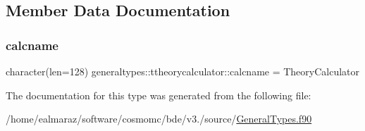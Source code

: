 \subsection{Member Data Documentation}
\mbox{\label{structgeneraltypes_1_1ttheorycalculator_a067210b836798b1f943cece4b98030ca}} 
\subsubsection{\texorpdfstring{calcname}{calcname}}
{\footnotesize\ttfamily character(len=128) generaltypes\+::ttheorycalculator\+::calcname = \textquotesingle{}Theory\+Calculator\textquotesingle{}\hspace{0.3cm}{\ttfamily [private]}}



The documentation for this type was generated from the following file\+:\begin{DoxyCompactItemize}
\item 
/home/ealmaraz/software/cosmomc/bde/v3./source/\mbox{\hyperlink{GeneralTypes_8f90}{General\+Types.\+f90}}\end{DoxyCompactItemize}
